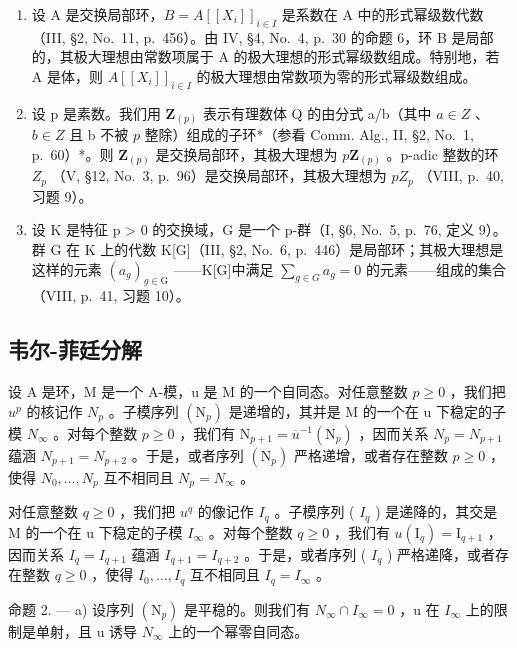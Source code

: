 \begin{enumerate}
\def\labelenumi{\arabic{enumi})}
\setcounter{enumi}{3}
\item
  设 A 是交换局部环，\(B = A[[X_{i}]]_{i \in I}\) 是系数在 A 中的形式幂级数代数（III, §2, No.~11, p.~456）。由 IV, §4, No.~4, p.~30 的命题 6，环 B 是局部的，其极大理想由常数项属于 A 的极大理想的形式幂级数组成。特别地，若 A 是体，则 \(A[[X_{i}]]_{i \in I}\) 的极大理想由常数项为零的形式幂级数组成。
\item
  设 p 是素数。我们用 \(\mathbf{Z}_{(p)}\) 表示有理数体 Q 的由分式 a/b（其中 \(a \in Z\) 、 \(b \in Z\) 且 b 不被 \(p\) 整除）组成的子环*（参看 Comm. Alg., II, §2, No.~1, p.~60）*。则 \(\mathbf{Z}_{(p)}\) 是交换局部环，其极大理想为 \(p\mathbf{Z}_{(p)}\) 。p-adic 整数的环 \(Z_{p}\) （V, §12, No.~3, p.~96）是交换局部环，其极大理想为 \(pZ_{p}\) （VIII, p.~40, 习题 9）。
\item
  设 K 是特征 p \textgreater{} 0 的交换域，G 是一个 p-群（I, §6, No.~5, p.~76, 定义 9）。群 G 在 K 上的代数 K{[}G{]}（III, §2, No.~6, p.~446）是局部环；其极大理想是这样的元素 \((a_{g})_{g \in \mathrm{G}}\) ——K{[}G{]}中满足 \(\sum_{g \in G} a_{g} = 0\) 的元素——组成的集合（VIII, p.~41, 习题 10）。
\end{enumerate}

\subsection{韦尔-菲廷分解}

设 A 是环，M 是一个 A-模，u 是 M 的一个自同态。对任意整数 \(p \geqslant 0\) ，我们把 \(u^{p}\) 的核记作 \(N_{p}\) 。子模序列 \((\mathrm{N}_{p})\) 是递增的，其并是 M 的一个在 u 下稳定的子模 \(N_{\infty}\) 。对每个整数 \(p \geqslant 0\) ，我们有 \(\mathrm{N}_{p+1} = \overline{u}^{-1}(\mathrm{N}_{p})\) ，因而关系 \(N_{p} = N_{p+1}\) 蕴涵 \(N_{p+1} = N_{p+2}\) 。于是，或者序列 \((\mathrm{N}_{p})\) 严格递增，或者存在整数 \(p \geqslant 0\) ，使得 \(N_{0}, \ldots, N_{p}\) 互不相同且 \(N_{p} = N_{\infty}\) 。

对任意整数 \(q \geqslant 0\) ，我们把 \(u^{q}\) 的像记作 \(I_{q}\) 。子模序列 ( \(I_{q}\) ) 是递降的，其交是 M 的一个在 u 下稳定的子模 \(I_{\infty}\) 。对每个整数 \(q \geqslant 0\) ，我们有 \(u(\mathrm{I}_{q}) = \mathrm{I}_{q+1}\) ，因而关系 \(I_{q} = I_{q+1}\) 蕴涵 \(I_{q+1} = I_{q+2}\) 。于是，或者序列 ( \(I_{q}\) ) 严格递降，或者存在整数 \(q \geqslant 0\) ，使得 \(I_{0}, \ldots, I_{q}\) 互不相同且 \(I_{q} = I_{\infty}\) 。

命题 2. --- a) 设序列 \((\mathrm{N}_{p})\) 是平稳的。则我们有 \(N_{\infty} \cap I_{\infty} = 0\) ，u 在 \(I_{\infty}\) 上的限制是单射，且 u 诱导 \(N_{\infty}\) 上的一个幂零自同态。

